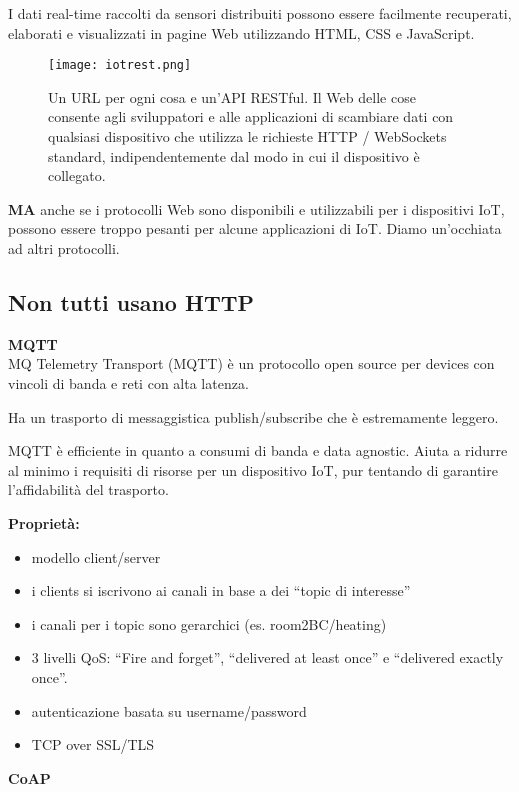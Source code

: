 I dati real-time raccolti da sensori distribuiti possono essere facilmente
recuperati, elaborati e visualizzati in pagine Web utilizzando HTML, CSS e
JavaScript.

\begin{figure}[H]
  \centering
  \texttt{[image: iotrest.png]}
  \caption{Un URL per ogni cosa e un'API RESTful.
Il Web delle cose consente agli sviluppatori e alle applicazioni di scambiare
dati con qualsiasi dispositivo che utilizza le richieste HTTP / WebSockets
standard, indipendentemente dal modo in cui il dispositivo è collegato.}
  \label{fig:iotrest}
\end{figure}

\textbf{MA} anche se i protocolli Web sono disponibili e utilizzabili per i
dispositivi IoT, possono essere troppo pesanti per alcune applicazioni di IoT.
Diamo un'occhiata ad altri protocolli.

\subsection{Non tutti usano HTTP}

\textbf{MQTT}\\

MQ Telemetry Transport (MQTT) è un protocollo open source per devices con
vincoli di banda e reti con alta latenza.

Ha un trasporto di messaggistica publish/subscribe che è estremamente leggero.

MQTT è efficiente in quanto a consumi di banda e data agnostic.
Aiuta a ridurre al minimo i requisiti di risorse per un dispositivo IoT,
pur tentando di garantire l'affidabilità del trasporto.

\textbf{Proprietà:}

\begin{itemize}
  \item modello client/server
  \item i clients si iscrivono ai canali in base a dei ``topic di interesse''
  \item i canali per i topic sono gerarchici (es. room2BC/heating)
  \item 3 livelli QoS: ``Fire and forget'',  ``delivered at least once'' e
 ``delivered exactly once''.
  \item autenticazione basata su username/password
  \item TCP over SSL/TLS
\end{itemize}

\textbf{CoAP}\\

